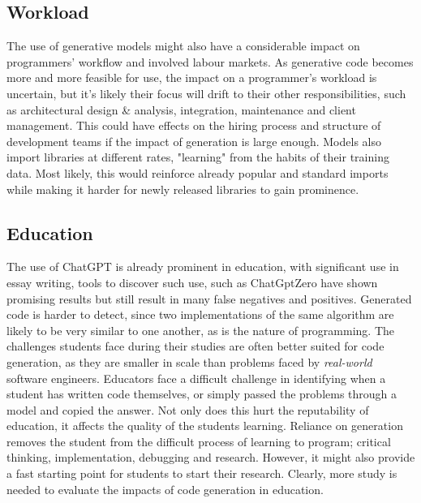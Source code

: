 \documentclass[manuscript,screen,review,sigconf]{acmart}
\begin{document}
\subsection{Workload}
The use of generative models might also have a considerable impact on programmers' workflow and involved labour markets. As generative code becomes more and more feasible for use, the impact on a programmer's workload is uncertain, but it's likely their focus will drift to their other responsibilities, such as architectural design \& analysis, integration, maintenance and client management. This could have effects on the hiring process and structure of development teams if the impact of generation is large enough. Models also import libraries at different rates, "learning" from the habits of their training data. Most likely, this would reinforce already popular and standard imports while making it harder for newly released libraries to gain prominence.
\subsection{Education}
The use of ChatGPT is already prominent in education, with significant use in essay writing, tools to discover such use, such as ChatGptZero have shown promising results but still result in many false negatives and positives. Generated code is harder to detect, since two implementations of the same algorithm are likely to be very similar to one another, as is the nature of programming. The challenges students face during their studies are often better suited for code generation, as they are smaller in scale than problems faced by \textit{real-world} software engineers. Educators face a difficult challenge in identifying when a student has written code themselves, or simply passed the problems through a model and copied the answer. Not only does this hurt the reputability of education, it affects the quality of the students learning. Reliance on generation removes the student from the difficult process of learning to program; critical thinking, implementation, debugging and research. However, it might also provide a fast starting point for students to start their research. Clearly, more study is needed to evaluate the impacts of code generation in education.
\end{document}

